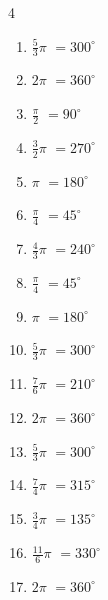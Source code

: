 \begin{multicols}{4}
\begin{enumerate}
  \item $\displaystyle \frac{5}{3}\pi$
        $\displaystyle =300^{\circ}$

  \item $\displaystyle 2\pi$
        $\displaystyle =360^{\circ}$

  \item $\displaystyle \frac{\pi}{2}$
        $\displaystyle =90^{\circ}$

  \item $\displaystyle \frac{3}{2}\pi$
        $\displaystyle =270^{\circ}$

  \item $\displaystyle \pi$
        $\displaystyle =180^{\circ}$

  \item $\displaystyle \frac{\pi}{4}$
        $\displaystyle =45^{\circ}$

  \item $\displaystyle \frac{4}{3}\pi$
        $\displaystyle =240^{\circ}$

  \item $\displaystyle \frac{\pi}{4}$
        $\displaystyle =45^{\circ}$

  \item $\displaystyle \pi$
        $\displaystyle =180^{\circ}$

  \item $\displaystyle \frac{5}{3}\pi$
        $\displaystyle =300^{\circ}$

  \item $\displaystyle \frac{7}{6}\pi$
        $\displaystyle =210^{\circ}$

  \item $\displaystyle 2\pi$
        $\displaystyle =360^{\circ}$

  \item $\displaystyle \frac{5}{3}\pi$
        $\displaystyle =300^{\circ}$

  \item $\displaystyle \frac{7}{4}\pi$
        $\displaystyle =315^{\circ}$

  \item $\displaystyle \frac{3}{4}\pi$
        $\displaystyle =135^{\circ}$

  \item $\displaystyle \frac{11}{6}\pi$
        $\displaystyle =330^{\circ}$

  \item $\displaystyle 2\pi$
        $\displaystyle =360^{\circ}$


\end{enumerate}
\end{multicols}
